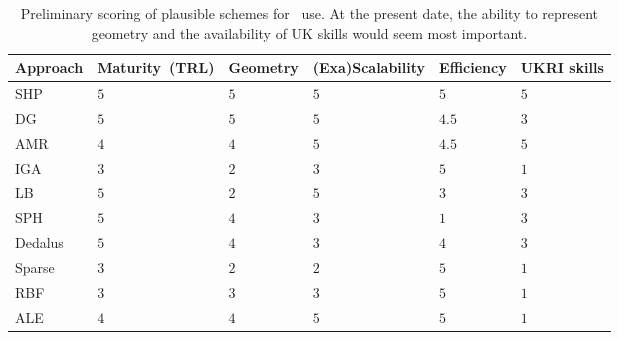 \begin{table}[h]\label{tab:assess}
\begin{center}
\caption{Preliminary scoring of plausible schemes for \nep\ use. At the present date, the ability to represent geometry
and the availability of UK skills would seem most important.}
\begin{tabular}{|p{2cm}|p{2.2cm}|p{1.8cm}|p{2.6cm}|p{1.8cm}|p{1.8cm}|}
\hline
Approach & Maturity~(TRL) & Geometry & (Exa)Scalability & Efficiency & UKRI skills \\
\hline
 SHP & $5$ & $5$ & $5$ & $5$ & $5$ \\
 DG & $5$ & $5$ & $5$ & $4.5$ & $3$ \\
 AMR & $4$ & $4$ & $5$ & $4.5$ & $5$ \\
 IGA & $3$ & $2$ & $3$ & $5$ & $1$ \\
 LB & $5$ & $2$ & $5$ & $3$ & $3$ \\
 SPH & $5$ & $4$ & $3$ & $1$ & $3$ \\
 Dedalus & $5$ & $4$ & $3$ & $4$ & $3$ \\
 Sparse & $3$ & $2$ & $2$ & $5$ & $1$ \\
 RBF & $3$ & $3$ & $3$ & $5$ & $1$ \\
 ALE & $4$ & $4$ & $5$ & $5$ & $1$ \\
\hline
\end{tabular}
\end{center}
\end{table}


